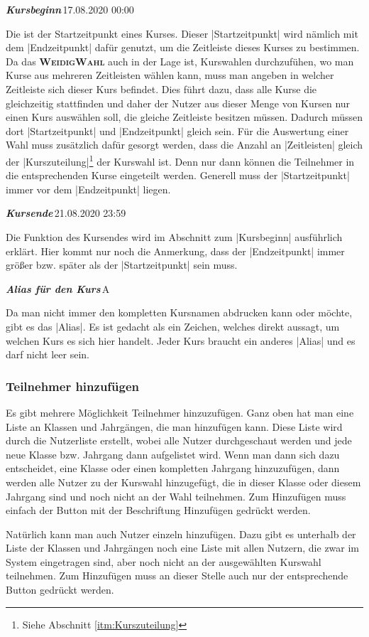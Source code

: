 \documentclass[ngerman]{ltxdoc}
\newcommand{\DescribeOption}[4]{
  \DescribeMacro{#1}
  \begin{minipage}[t]{\textwidth}
    \textit{\textbf{\textcolor{mLightGreen}{#2}}}\dotfill\,#3\par
    \begingroup
    \vspace{0.5em}#4\par
    \endgroup
  \end{minipage}
}
\newcommand{\name}{\textbf{\textsc{WeidigWahl}}\xspace}
\begin{document}
\DescribeOption{Beginn}{Kursbeginn}{17.08.2020 00:00}{
 Die ist der Startzeitpunkt eines Kurses. Dieser |Startzeitpunkt| wird nämlich
 mit dem |Endzeitpunkt| dafür genutzt, um die Zeitleiste dieses Kurses zu bestimmen.
 Da das \name auch in der Lage ist, Kurswahlen durchzufühen, wo man Kurse aus mehreren
 Zeitleisten wählen kann, muss man angeben in welcher Zeitleiste sich dieser Kurs
 befindet. Dies führt dazu, dass alle Kurse die gleichzeitig stattfinden und daher
 der Nutzer aus dieser Menge von Kursen nur einen Kurs auswählen soll, die gleiche
 Zeitleiste besitzen müssen. Dadurch müssen dort |Startzeitpunkt| und |Endzeitpunkt|
 gleich sein. Für die Auswertung einer Wahl muss zusätzlich dafür gesorgt werden,
 dass die Anzahl an |Zeitleisten| gleich der |Kurszuteilung|\footnote{Siehe Abschnitt \ref{itm:Kurszuteilung}}
 der Kurswahl ist. Denn nur dann können die Teilnehmer in die entsprechenden
 Kurse eingeteilt werden. Generell muss der |Startzeitpunkt| immer vor dem |Endzeitpunkt|
 liegen.
}

\DescribeOption{Ende}{Kursende}{21.08.2020 23:59}{
Die Funktion des Kursendes wird im Abschnitt zum |Kursbeginn| ausführlich erklärt.
Hier kommt nur noch die Anmerkung, dass der |Endzeitpunkt| immer größer bzw. später
als der |Startzeitpunkt| sein muss.
}

\DescribeOption{Alias}{Alias für den Kurs}{A}{
  Da man nicht immer den kompletten Kursnamen abdrucken kann oder möchte, gibt es
  das |Alias|. Es ist gedacht als ein Zeichen, welches direkt aussagt, um welchen
  Kurs es sich hier handelt. Jeder Kurs braucht ein anderes |Alias| und es darf
  nicht leer sein.
}

\subsubsection{Teilnehmer hinzufügen}

Es gibt mehrere Möglichkeit Teilnehmer hinzuzufügen. Ganz oben hat man eine Liste
an Klassen und Jahrgängen, die man hinzufügen kann. Diese Liste wird durch die
Nutzerliste erstellt, wobei alle Nutzer durchgeschaut werden und jede neue Klasse
bzw. Jahrgang dann aufgelistet wird. Wenn man dann sich dazu entscheidet, eine Klasse
oder einen kompletten Jahrgang hinzuzufügen, dann werden alle Nutzer zu der Kurswahl
hinzugefügt, die in dieser Klasse oder diesem Jahrgang sind und noch nicht an der Wahl
teilnehmen. Zum Hinzufügen muss einfach der Button mit der Beschriftung \glqq Hinzufügen\grqq{}
gedrückt werden.

Natürlich kann man auch Nutzer einzeln hinzufügen. Dazu gibt es unterhalb der Liste
der Klassen und Jahrgängen noch eine Liste mit allen Nutzern, die zwar im System
eingetragen sind, aber noch nicht an der ausgewählten Kurswahl teilnehmen. Zum Hinzufügen
muss an dieser Stelle auch nur der entsprechende Button gedrückt werden.
\end{document}
